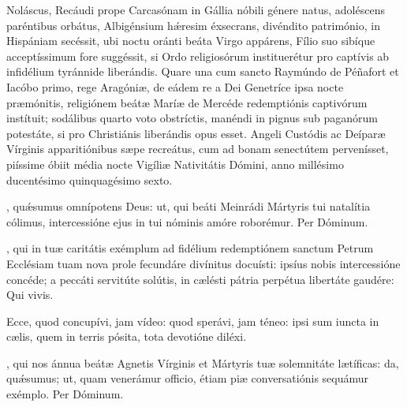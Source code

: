 \documentclass[fontsize=9pt,paper=A6,twoside,BCOR=1mm,DIV=22,headinclude]{scrarticle}
\renewcommand\A\Ant
\begin{document}
\begin{multicols}{2}
\RMVviii

 Noláscus, Recáudi prope Carcasónam in Gállia nóbili génere natus, adoléscens paréntibus orbátus, Albigénsium hǽresim éxsecrans, divéndito património, in Hispániam secéssit, ubi noctu oránti beáta Virgo appárens, Fílio suo sibíque acceptíssimum fore suggéssit, si Ordo religiosórum instituerétur pro captívis ab infidélium tyránnide liberándis. Quare una cum sancto Raymúndo de Péñafort et Iacóbo primo, rege Aragóniæ, de eádem re a Dei Genetríce ipsa nocte præmónitis, religiónem beátæ Maríæ de Mercéde redemptiónis captivórum instítuit; sodálibus quarto voto obstríctis, manéndi in pignus sub paganórum potestáte, si pro Christiánis liberándis opus esset. Angeli Custódis ac Deíparæ Vírginis apparitiónibus sæpe recreátus, cum ad bonam senectútem pervenísset, piíssime óbiit média nocte Vigíliæ Nativitátis Dómini, anno millésimo ducentésimo quinquagésimo sexto.

\Te 


\VRMii 

\BM

, qu\'æsumus omnípotens Deus: ut, qui beáti Meinrádi Mártyris tui natalítia cólimus, intercessióne ejus in tui nóminis amóre roborémur. Per Dóminum.



\AiiC 

\VRCii 

, qui in tuæ caritátis exémplum ad fidélium redemptiónem sanctum Petrum Ecclésiam tuam nova prole fecundáre divínitus docuísti: ipsíus nobis intercessióne concéde; a peccáti servitúte solútis, in cælésti pátria perpétua libertáte gaudére: \red{(}Qui vivis.\red{)}



\A Ecce, quod concupívi, jam vídeo: quod sperávi, jam téneo: ipsi sum iuncta in cælis, quem in terris pósita, tota devotióne diléxi.

\VRVii

, qui nos ánnua beátæ Agnetis Vírginis et Mártyris tuæ solemnitáte lætíficas: da, quǽsumus; ut, quam venerámur officio, étiam piæ conversatiónis sequámur exémplo. Per Dóminum.


\AiiiM


\end{multicols}
\end{document}
